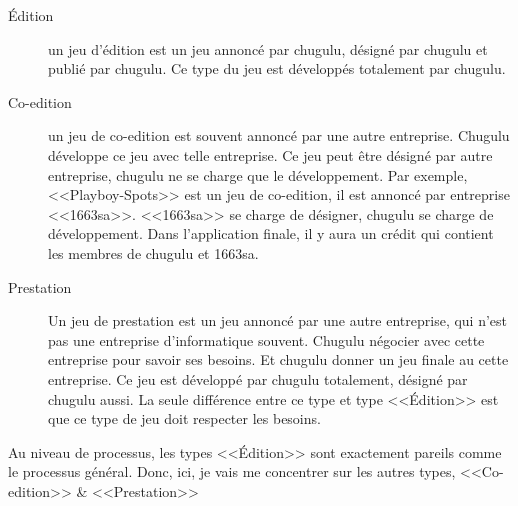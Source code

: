 \begin{description}
	\item[Édition] un jeu d'édition est un jeu annoncé par chugulu, désigné par chugulu et publié par chugulu. Ce type du jeu est développés totalement par chugulu.
	\item[Co-edition] un jeu de co-edition est souvent annoncé par une autre entreprise. Chugulu développe ce jeu avec telle entreprise. Ce jeu peut être désigné par autre entreprise, chugulu ne se charge que le développement. Par exemple, <<Playboy-Spots>> est un jeu de co-edition, il est annoncé par entreprise <<1663sa>>. <<1663sa>> se charge de désigner, chugulu se charge de développement. Dans l'application finale, il y aura un crédit qui contient les membres de chugulu et 1663sa.
	\item[Prestation] Un jeu de prestation est un jeu annoncé par une autre entreprise, qui n'est pas une entreprise d'informatique souvent. Chugulu négocier avec cette entreprise pour savoir ses besoins. Et chugulu donner un jeu finale au cette entreprise. Ce jeu est développé par chugulu totalement, désigné par chugulu aussi. La seule différence entre ce type et type <<Édition>> est que ce type de jeu doit respecter les besoins.
\end{description}

Au niveau de processus, les types <<Édition>> sont exactement pareils comme le processus général. Donc, ici, je vais me concentrer sur les autres types, <<Co-edition>> \& <<Prestation>>



